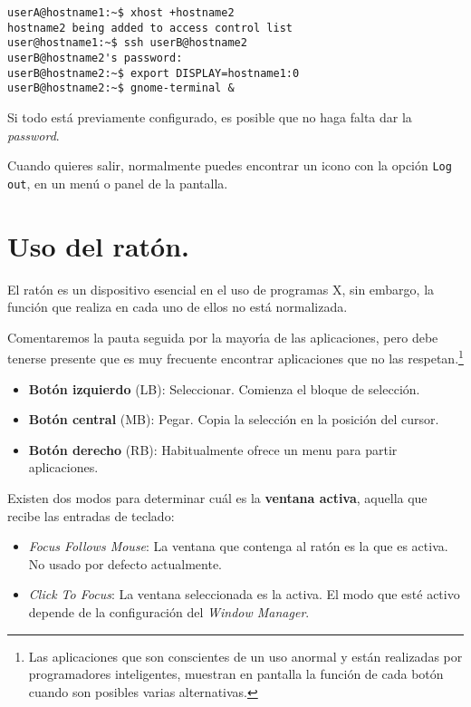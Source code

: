 \begin{verbatim}
userA@hostname1:~$ xhost +hostname2
hostname2 being added to access control list
user@hostname1:~$ ssh userB@hostname2
userB@hostname2's password:
userB@hostname2:~$ export DISPLAY=hostname1:0
userB@hostname2:~$ gnome-terminal &
\end{verbatim}

Si todo est{\'a} previamente configurado, es posible que no haga falta
dar la {\it password}.

Cuando quieres salir, normalmente puedes encontrar un icono con la
opci{\'o}n \verb+Log out+, en un men{\'u} o panel de la pantalla. 

\section{Uso del rat{\'o}n.}

El rat{\'o}n es un dispositivo esencial en el uso de programas X, sin
embargo, la funci{\'o}n que realiza en cada uno de ellos no est{\'a}
normalizada.

Comentaremos la pauta seguida por la mayor{\'\i}a de las aplicaciones, pero
debe tenerse presente que es muy frecuente encontrar aplicaciones que
no las respetan.\footnote{Las aplicaciones que son conscientes de un
  uso anormal y est{\'a}n realizadas por programadores inteligentes,
  muestran en pantalla la funci{\'o}n de cada bot{\'o}n cuando son posibles
  varias alternativas.}

\begin{itemize}
  
\item {\bf Bot{\'o}n izquierdo} (LB): Seleccionar. Comienza el bloque de
  selecci{\'o}n.
  
\item {\bf Bot{\'o}n central} (MB): Pegar. Copia la selecci{\'o}n en la
  posici{\'o}n del cursor.

\item {\bf Bot{\'o}n derecho} (RB): Habitualmente ofrece un menu para
  partir aplicaciones.
\end{itemize}
  
Existen dos modos para determinar cu{\'a}l es la {\bf ventana activa},
aquella que recibe las entradas de teclado:

\begin{itemize}
\item {\it Focus Follows Mouse}: La ventana que contenga al rat{\'o}n es la
  que es activa. No usado por defecto actualmente. 
  
\item {\it Click To Focus}: La ventana seleccionada es la activa. El
  modo que est{\'e} activo depende de la configuraci{\'o}n del {\it Window
    Manager}.
\end{itemize}


